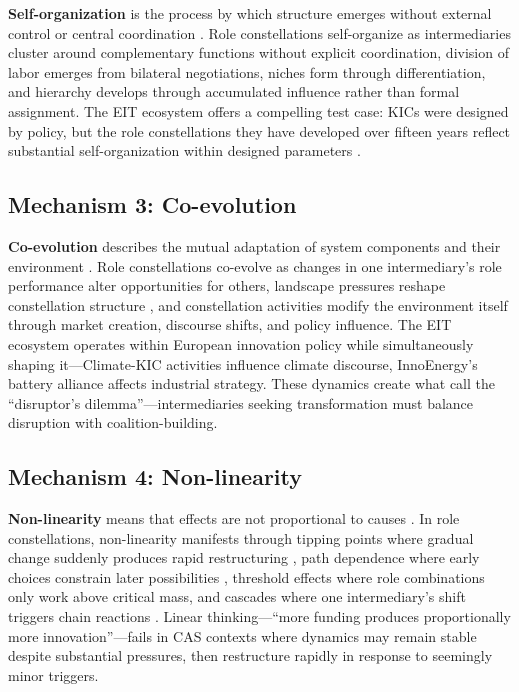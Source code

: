 \documentclass[../main.tex]{subfiles}
\begin{document}
\textbf{Self-organization} is the process by which structure emerges without external control or central coordination \cite{kauffman1993origins}. Role constellations self-organize as intermediaries cluster around complementary functions without explicit coordination, division of labor emerges from bilateral negotiations, niches form through differentiation, and hierarchy develops through accumulated influence rather than formal assignment. The EIT ecosystem offers a compelling test case: KICs were designed by policy, but the role constellations they have developed over fifteen years reflect substantial self-organization within designed parameters \cite{peltoniemi2006preliminary}.

\subsection{Mechanism 3: Co-evolution}

\textbf{Co-evolution} describes the mutual adaptation of system components and their environment \cite{kauffman1991coevolution}. Role constellations co-evolve as changes in one intermediary's role performance alter opportunities for others, landscape pressures reshape constellation structure \cite{geels2017sustainability}, and constellation activities modify the environment itself through market creation, discourse shifts, and policy influence. The EIT ecosystem operates within European innovation policy while simultaneously shaping it---Climate-KIC activities influence climate discourse, InnoEnergy's battery alliance affects industrial strategy. These dynamics create what \textcite{ansari2016disruptor} call the ``disruptor's dilemma''---intermediaries seeking transformation must balance disruption with coalition-building.

\subsection{Mechanism 4: Non-linearity}

\textbf{Non-linearity} means that effects are not proportional to causes \cite{anderson1999complexity}. In role constellations, non-linearity manifests through tipping points where gradual change suddenly produces rapid restructuring \cite{scheffer2009critical}, path dependence where early choices constrain later possibilities \cite{david1985clio}, threshold effects where role combinations only work above critical mass, and cascades where one intermediary's shift triggers chain reactions \cite{watts2002simple}. Linear thinking---``more funding produces proportionally more innovation''---fails in CAS contexts where dynamics may remain stable despite substantial pressures, then restructure rapidly in response to seemingly minor triggers.
\end{document}
